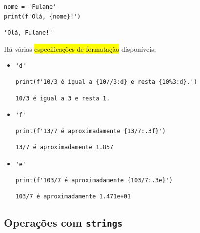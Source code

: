 \begin{lstlisting}
nome = 'Fulane'
print(f'Olá, {nome}!')
\end{lstlisting}

\begin{verbatim}
'Olá, Fulane!'
\end{verbatim}

Há várias \hl{especificações de formatação} disponíveis:
\begin{itemize}
\item \lstinline+'d'+ 

\begin{lstlisting}[xrightmargin=2.5em]
print(f'10/3 é igual a {10//3:d} e resta {10%3:d}.')
\end{lstlisting}

\begin{verbatim}
10/3 é igual a 3 e resta 1.
\end{verbatim}

\item \lstinline+'f'+ 

\begin{lstlisting}[xrightmargin=2.5em]
print(f'13/7 é aproximadamente {13/7:.3f}')
\end{lstlisting}

\begin{verbatim}
13/7 é aproximadamente 1.857
\end{verbatim}

\item \lstinline+'e'+ 

\begin{lstlisting}[xrightmargin=2.5em]
print(f'103/7 é aproximadamente {103/7:.3e}')
\end{lstlisting}  

\begin{verbatim}
103/7 é aproximadamente 1.471e+01
\end{verbatim}

\end{itemize}

\subsection{Operações com \texttt{strings}}


